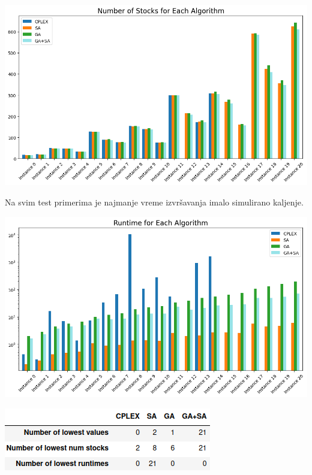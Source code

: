 \documentclass[12pt, a4paper]{article}
\begin{document}
\vspace{0.5cm}
\begin{center}
  \hspace{1cm}
  \includegraphics[width=\linewidth]{img/comparison_stocks.png}
  \hspace{1cm} 
\end{center}
\vspace{0.5cm}

Na svim test primerima je najmanje vreme izvršavanja imalo simulirano kaljenje.

\vspace{0.5cm}
\begin{center}
  \hspace{1cm}
  \includegraphics[width=\linewidth]{img/comparison_runtime.png}
  \hspace{1cm} 
\end{center}
\vspace{0.5cm}

\vspace{0.5cm}
\begin{center}
  \hspace{1cm}
  \includegraphics[width=0.6\linewidth]{img/comparison_table.png}
  \hspace{1cm} 
\end{center}
\vspace{0.5cm}

\printbibliography
\end{document}

